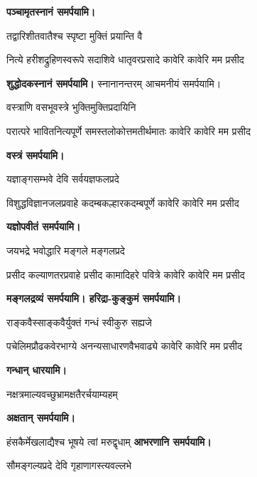 \begin{center}
\begin{center}
\textbf{\devAya{} पञ्चामृतस्नानं समर्पयामि।}

{तद्वारिशीतवातैश्च स्पृष्टा मुक्तिं प्रयान्ति वै}

{नित्ये हरीशद्रुहिणस्वरूपे}
{सदाशिवे धातृवरप्रसादे}
{कावेरि कावेरि मम प्रसीद}

\textbf{\devAya{} शुद्धोदकस्नानं समर्पयामि।}
स्नानानन्तरम् आचमनीयं समर्पयामि।

{वस्त्राणि वसभूवस्त्रे भुक्तिमुक्तिप्रदायिनि}

{परात्परे भावितनित्यपूर्णे}
{समस्तलोकोत्तमतीर्थमातः}
{कावेरि कावेरि मम प्रसीद}

\textbf{\devAya{} वस्त्रं समर्पयामि।}

{यज्ञाङ्गसम्भवे देवि सर्वयज्ञफलप्रदे}

{विशुद्धविज्ञानजलप्रवाहे}
{कदम्बकल्हारकदम्बपूर्णे}
{कावेरि कावेरि मम प्रसीद}

\textbf{\devAya{} यज्ञोपवीतं समर्पयामि।}

{जयभद्रे भवोद्धारि मङ्गले मङ्गलप्रदे}

{प्रसीद कल्याणतरप्रवाहे}
{प्रसीद कामादिहरे पवित्रे}
{कावेरि कावेरि मम प्रसीद}

\textbf{\devAya{} मङ्गलद्रव्यं समर्पयामि। हरिद्रा-कुङ्कुमं समर्पयामि।}

{राङ्कवैस्साङ्कवैर्युक्तं गन्धं स्वीकुरु सह्यजे}

{पचेलिमप्रौढकवेरभाग्ये}
{अनन्यसाधारणवैभवाढ्ये}
{कावेरि कावेरि मम प्रसीद}

\textbf{\devAya{} गन्धान् धारयामि।}

{नक्षत्रमाल्यवच्छुभ्रामक्षतैरर्चयाम्यहम्}

\textbf{\devAya{} अक्षतान् समर्पयामि।}

{हंसकैर्मेखलाद्यैश्च भूषये त्वां मरुद्वृधाम्}
\textbf{\devAya{} आभरणानि समर्पयामि।}

{सौमङ्गल्यप्रदे देवि गृहाणागस्त्यवल्लभे}


\end{center}
\end{center}
